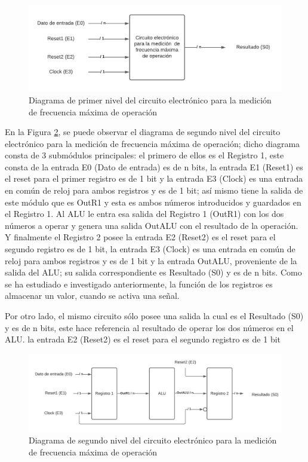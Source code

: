 \documentclass[journal]{IEEEtran}
\begin{document}
	
	\begin{figure}[hbtp]
		\centering
		\includegraphics[scale = 0.4]{img/nivel12.png}
		\caption{Diagrama de primer nivel del circuito electrónico para la medición  de frecuencia máxima de operación}
		\label{fig:niv12}
	\end{figure}
	
	
	En la Figura \ref{fig:niv22}, se puede observar el diagrama de segundo nivel del circuito electrónico para la medición de frecuencia máxima de operación; dicho diagrama consta de 3 submódulos principales: el primero de ellos es el Registro 1, este consta de la entrada E0 (Dato de entrada) es de n bits, la entrada E1 (Reset1) es el reset para el primer registro es de 1 bit y la entrada E3 (Clock) es una entrada en común de reloj para ambos registros y es de 1 bit; así mismo tiene la salida de este módulo que es OutR1 y esta es ambos números introducidos y guardados en el Registro 1. Al ALU le entra esa salida del Registro 1 (OutR1) con los dos números a operar y genera una salida OutALU con el resultado de la operación. Y finalmente el Registro 2 posee la entrada E2 (Reset2) es el reset para el segundo registro es de 1 bit, la entrada E3 (Clock) es una entrada en común de reloj para ambos registros y es de 1 bit y la entrada OutALU, proveniente de la salida del ALU; su salida correspondiente es Resultado (S0) y es de n bits. Como se ha estudiado e investigado anteriormente, la función de los registros es almacenar un valor, cuando se activa una señal.
	
	Por otro lado, el mismo circuito sólo posee una salida la cual es el Resultado (S0) y es de n bits, este hace referencia al resultado de operar los dos números en el ALU.  la entrada E2 (Reset2) es el reset para el segundo registro es de 1 bit
	
	\begin{figure}[hbtp]
		\centering
		\includegraphics[scale = 0.37]{img/nivel22.png}
		\caption{Diagrama de segundo nivel del circuito electrónico para la medición  de frecuencia máxima de operación}
		\label{fig:niv22}
	\end{figure}
	
\end{document}
